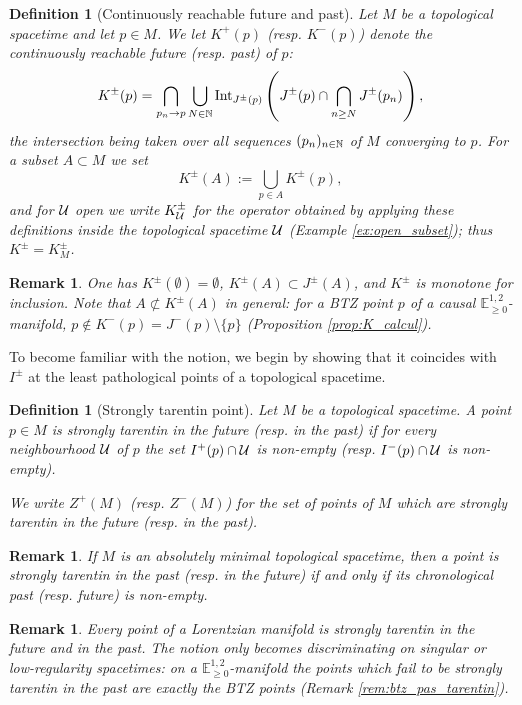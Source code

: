\documentclass[a4paper,twoside]{article}
\newcommand{\mass}[1]{\mathbb{E}^{1,2}_{#1}}
\newtheorem{defi}[lem]{Definition}
\newtheorem{rem}[lem]{Remark}
\begin{document}
\begin{defi}[Continuously reachable future and past]\label{defi:futur_continue}
Let $M$ be a topological spacetime and let $p\in M$. We let $K^+(p)$ (resp. $K^-(p)$) denote the continuously reachable future (resp. past) of $p$:
$$K^\pm(p)=\bigcap_{p_n\rightarrow p} \bigcup_{N\in \mathbb{N}} \mathrm{Int}_{J^\pm(p)}\left( J^\pm(p)\cap \bigcap_{n\geq N} J^\pm(p_n)\right),
$$
the intersection being taken over all sequences $(p_n)_{n\in \mathbb{N}}$ of $M$ converging to $p$.
For a subset $A\subset M$ we set
$$K^\pm(A):=\bigcup_{p\in A} K^\pm(p),$$
and for $\mathcal{U}$ open we write $K^\pm_{\mathcal{U}}$ for the operator obtained by applying these definitions inside the topological spacetime $\mathcal{U}$ (Example \ref{ex:open_subset}); thus $K^\pm=K^\pm_M$.
\end{defi}
\begin{rem}\label{rem:K_ensemble}
One has $K^\pm(\emptyset)=\emptyset$, $K^\pm(A)\subset J^\pm(A)$, and $K^\pm$ is monotone for inclusion. Note that $A\not\subset K^\pm(A)$ in general: for a BTZ point $p$ of a causal $\mass{\geq0}$-manifold, $p\notin K^-(p)=J^-(p)\setminus\{p\}$ (Proposition \ref{prop:K_calcul}).
\end{rem}

To become familiar with the notion, we begin by showing that it coincides with $I^\pm$ at the
least pathological points of a topological spacetime.
\begin{defi}[Strongly tarentin point]
Let $M$ be a topological spacetime. A point $p\in M$ is strongly tarentin in the future (resp. in the past)
if for every neighbourhood $\mathcal{U}$ of $p$ the set $I^+(p)\cap \mathcal{U}$ is non-empty (resp. $I^-(p)\cap \mathcal{U}$ is non-empty).

We write $Z^+(M)$ (resp. $Z^-(M)$) for the set of points of $M$ which are strongly tarentin in the future (resp. in the past).
\end{defi}
\begin{rem} If $M$ is an absolutely minimal topological spacetime, then a point is strongly tarentin
in the past (resp. in the future) if and only if its chronological past (resp. future) is non-empty.
\end{rem}
\begin{rem}\label{rem:lorentz_tarentin}
Every point of a Lorentzian manifold is strongly tarentin in the future and in the past. The notion
only becomes discriminating on singular or low-regularity spacetimes: on a $\mass{\geq0}$-manifold
the points which fail to be strongly tarentin in the past are exactly the BTZ points (Remark
\ref{rem:btz_pas_tarentin}).
\end{rem}
\end{document}
